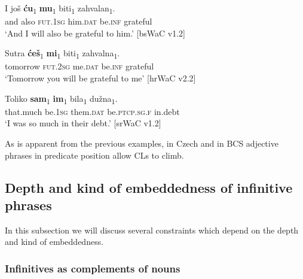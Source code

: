 \begin{exe}\ex\label{(11.11)}
\gll I još \textbf{ću}\textsubscript{1} \textbf{mu}\textsubscript{1} biti\textsubscript{1} zahvalan\textsubscript{1}.\\
and also \textsc{fut}.1\textsc{sg} him.\textsc{dat} be.\textsc{inf} grateful \\
\glt ‘And I will also be grateful to him.’
\hfill [bsWaC v1.2]

\ex\label{(11.12)}
\gll Sutra \textbf{ćeš}\textsubscript{1} \textbf{mi}\textsubscript{1} biti\textsubscript{1} zahvalna\textsubscript{1}. \\
tomorrow \textsc{fut}.2\textsc{sg} me.\textsc{dat} be.\textsc{inf} grateful \\
\glt ‘Tomorrow you will be grateful to me’
\hfill [hrWaC v2.2]

\ex\label{(11.13)}
\gll Toliko \textbf{sam}\textsubscript{1} \textbf{im}\textsubscript{1} bila\textsubscript{1} dužna\textsubscript{1}.\\
that.much be.1\textsc{sg} them.\textsc{dat} be.\textsc{ptcp}.\textsc{sg}.\textsc{f} in.debt \\
\glt ‘I was so much in their debt.’
\hfill [srWaC v1.2]
\end{exe}

\noindent As is apparent from the previous examples, in Czech and in BCS adjective phrases in predicate position allow CLs to climb.

\subsection{Depth and kind of embeddedness of infinitive phrases}
\label{Depth and kind of embeddedness of infinitive phrases}

In this subsection we will discuss several constraints which depend on the depth and kind of embeddedness. 

\subsubsection{Infinitives as complements of nouns}
\label{Infinitives as complements of nouns}

